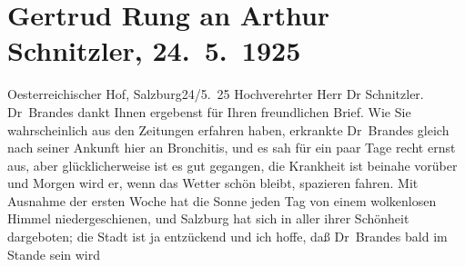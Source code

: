 

               \section[Gertrud Rung an Arthur Schnitzler, 24. 5. 1925]{ Gertrud Rung an Arthur Schnitzler, 24. 5. 1925}\nopagebreak{}\rehead{ }\begin{ledgroupsized}[t]{13cm}\normalsize\beginnumbering{} \toendnotes[C]{\smallbreak\pagebreak[2]} 
\pstart
           \raggedleft{}{\pb}Oesterreichischer Hof, Salzburg24/5. 25\pend
           \pstart{}Hochverehrter Herr Dr Schnitzler.\pend\pstart
           Dr Brandes dankt Ihnen ergebenst für Ihren
                    freundlichen Brief. Wie Sie wahrscheinlich aus den Zeitungen erfahren haben,
                    erkrankte Dr Brandes gleich nach seiner
                    Ankunft hier an Bronchitis, und es sah für ein paar Tage recht ernst aus, aber
                    glücklicherweise ist es gut gegangen, die Krankheit ist beinahe vorüber und
                    Morgen {\pb}wird er, wenn das
                    Wetter schön bleibt, spazieren fahren.\pend
           \pstart
           Mit Ausnahme der ersten Woche hat die Sonne jeden Tag von einem wolkenlosen
                    Himmel niedergeschienen, und Salzburg hat sich
                    in aller ihrer Schönheit dargeboten; die Stadt ist ja entzückend und ich hoffe,
                    daß Dr Brandes bald im Stande sein wird

\end{ledgroupsized}
